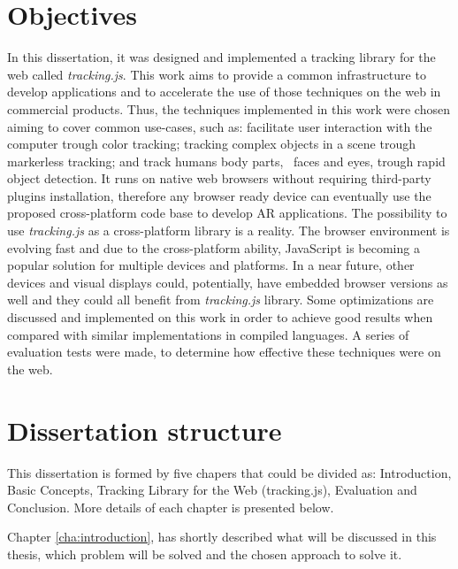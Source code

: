 
\section{Objectives} %
\label{sec:introduction:objectives}

In this dissertation, it was designed and implemented a tracking library for the web called \textit{tracking.js}. This work aims to provide a common infrastructure to develop applications and to accelerate the use of those techniques on the web in commercial products. Thus, the techniques implemented in this work were chosen aiming to cover common use-cases, such as: facilitate user interaction with the computer trough color tracking; tracking complex objects in a scene trough markerless tracking; and track humans body parts, \eg\ faces and eyes, trough rapid object detection. It runs on native web browsers without requiring third-party plugins installation, therefore any browser ready device can eventually use the proposed cross-platform code base to develop AR applications. The possibility to use \textit{tracking.js} as a cross-platform library is a reality. The browser environment is evolving fast and due to the cross-platform ability, JavaScript \cite{International2009} is becoming a popular solution for multiple devices and platforms. In a near future, other devices and visual displays could, potentially, have embedded browser versions as well and they could all benefit from \textit{tracking.js} library. Some optimizations are discussed and implemented on this work in order to achieve good results when compared with similar implementations in compiled languages. A series of evaluation tests were made, to determine how effective these techniques were on the web.


\section{Dissertation structure} %
\label{sec:introduction:dissertation_structure}

This dissertation is formed by five chapers that could be divided as: Introduction, Basic Concepts, Tracking Library for the Web (tracking.js), Evaluation and Conclusion. More details of each chapter is presented below.

Chapter \ref{cha:introduction}, has shortly described what will be discussed in this thesis, which problem will be solved and the chosen approach to solve it.

